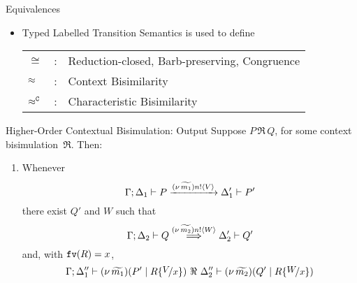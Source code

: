 \documentclass{beamer}
\begin{document}
	\begin{frame}{Equivalences}
		\begin{itemize}
			\item	Typed Labelled Transition Semantics is used to define

			\begin{tabular}{lcl}
				$\cong$ &:& Reduction-closed, Barb-preserving, Congruence\\
				$\approx$ &:& Context Bisimilarity\\
				$\approx^\mathtt{C}$ &:& Characteristic Bisimilarity
			\end{tabular}

		\end{itemize}
	\end{frame}


	\begin{frame}{Higher-Order Contextual Bisimulation: Output}
		Suppose $P \,\Re\, Q$, for some context bisimulation~$\Re$. Then:
		\begin{enumerate}[$(\star)$]
			\item	Whenever
				\[
					\Gamma; \Delta_1 \vdash P \xrightarrow{(\nu\, \widetilde{m_1}) n ! \langle V \rangle} \Delta_1' \vdash P'
				\]
				there exist $Q'$ and $W$ such that 
				\[
					\Gamma; \Delta_2 \vdash Q \stackrel{(\nu\, \widetilde{m_2}) n ! \langle W \rangle}{\Longrightarrow} \Delta_2' \vdash Q'
				\]
				and,   with $\mathtt{fv}(R)=x$, 
				\[
					\Gamma; \Delta_1'' \proves \newsp{\widetilde{m_1}}{P' \Par R\subst{V}{x}}\ \Re\ \Delta_2'' \proves \newsp{\widetilde{m_2}}{Q' \Par R\subst{W}{x}}
				\]
		\end{enumerate}
	\end{frame}
\end{document}
